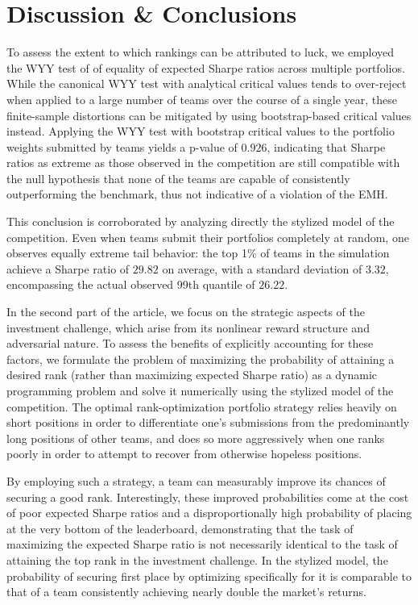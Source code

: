 \documentclass[3p,times,twocolumn]{elsarticle}
\begin{document}
\section{Discussion \& Conclusions}\label{section:conclusions}

To assess the extent to which rankings can be attributed to luck, we employed the WYY test of \citet{wrightTestEqualityMultiple2014} of equality of expected Sharpe ratios across multiple portfolios. 
While the canonical WYY test with analytical critical values tends to over-reject when applied to a large number of teams over the course of a single year, these finite-sample distortions can be mitigated by using bootstrap-based critical values instead. 
Applying the WYY test with bootstrap critical values to the portfolio weights submitted by teams yields a p-value of $0.926$, indicating that Sharpe ratios as extreme as those observed in the competition are still compatible with the null hypothesis that none of the teams are capable of consistently outperforming the benchmark, thus not indicative of a violation of the EMH.

This conclusion is corroborated by analyzing directly the stylized model of the competition.
Even when teams submit their portfolios completely at random, one observes equally extreme tail behavior: the top 1\% of teams in the simulation achieve a Sharpe ratio of $29.82$ on average, with a standard deviation of $3.32$, encompassing the actual observed 99th quantile of $26.22$.

In the second part of the article, we focus on the strategic aspects of the investment challenge, which arise from its nonlinear reward structure and adversarial nature. 
To assess the benefits of explicitly accounting for these factors, we formulate the problem of maximizing the probability of attaining a desired rank (rather than maximizing expected Sharpe ratio) as a dynamic programming problem and solve it numerically using the stylized model of the competition.
The optimal rank-optimization portfolio strategy relies heavily on short positions in order to differentiate one's submissions from the predominantly long positions of other teams, and does so more aggressively when one ranks poorly in order to attempt to recover from otherwise hopeless positions.

By employing such a strategy, a team can measurably improve its chances of securing a good rank.
Interestingly, these improved probabilities come at the cost of poor expected Sharpe ratios and a disproportionally high probability of placing at the very bottom of the leaderboard, demonstrating that the task of maximizing the expected Sharpe ratio is not necessarily identical to the task of attaining the top rank in the investment challenge.
In the stylized model, the probability of securing first place by optimizing specifically for it is comparable to that of a team consistently achieving nearly double the market’s returns.
\end{document}
